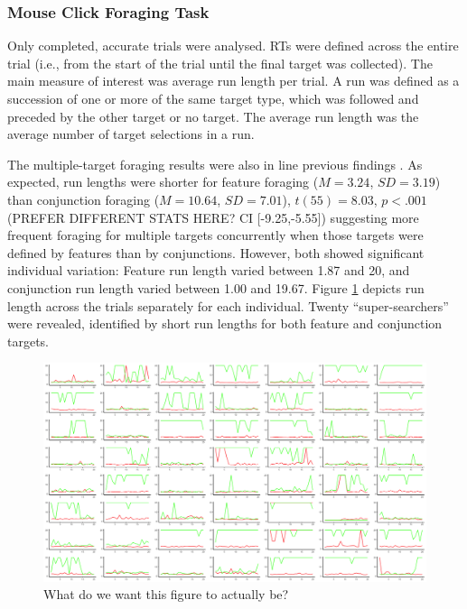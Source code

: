 \documentclass[]{rsos}%
\begin{document}
\subsubsection{Mouse Click Foraging Task}

Only completed, accurate trials were analysed. RTs were defined across the entire trial (i.e., from the start of the trial until the final target was collected). The main measure of interest was average run length per trial. A run was defined as a succession of one or more of the same target type, which was followed and preceded by the other target or no target. The average run length was the average number of target selections in a run. 

The multiple-target foraging results were also in line previous findings \cite{kristjansson2014,johannesson2016}. As expected, run lengths were shorter for feature foraging ($M = 3.24$, $SD = 3.19$) than conjunction foraging ($M = 10.64$, $SD = 7.01$), $t(55) = 8.03$, $p < .001$ (PREFER DIFFERENT STATS HERE? CI [-9.25,-5.55]) suggesting more frequent foraging for multiple targets concurrently when those targets were defined by features than by conjunctions. However, both showed significant individual variation: Feature run length varied between 1.87 and 20, and conjunction run length varied between 1.00 and 19.67. Figure \ref{fig:foraging_summary} depicts run length across the trials separately for each individual. Twenty ``super-searchers'' were revealed, identified by short run lengths for both feature and conjunction targets. 

\begin{figure}
\centering
\includegraphics[width=\textwidth]{../Scripts/foraging/FG_IndivDiffsFig.png}
\caption{What do we want this figure to actually be?}
\label{fig:foraging_summary}
\end{figure}
\end{document}
